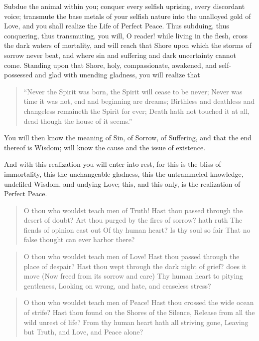 \documentclass[12pt,oneside]{scrbook}
\begin{document}
  Subdue the animal within you; conquer every selfish uprising, every
  discordant voice; transmute the base metals of your selfish nature into
  the unalloyed gold of Love, and you shall realize the Life of Perfect
  Peace. Thus subduing, thus conquering, thus transmuting, you will, O
  reader! while living in the flesh, cross the dark waters of mortality,
  and will reach that Shore upon which the storms of sorrow never beat,
  and where sin and suffering and dark uncertainty cannot come. Standing
  upon that Shore, holy, compassionate, awakened, and self-possessed and
  glad with unending gladness, you will realize that
  
  \begin{quote}
  ``Never the Spirit was born, the Spirit will cease to be never; Never
  was time it was not, end and beginning are dreams; Birthless and
  deathless and changeless remaineth the Spirit for ever; Death hath not
  touched it at all, dead though the house of it seems.''
  \end{quote}
  
  You will then know the meaning of Sin, of Sorrow, of Suffering, and that
  the end thereof is Wisdom; will know the cause and the issue of
  existence.
  
  And with this realization you will enter into rest, for this is the
  bliss of immortality, this the unchangeable gladness, this the
  untrammeled knowledge, undefiled Wisdom, and undying Love; this, and
  this only, is the realization of Perfect Peace.
  
  \begin{quote}
  O thou who wouldst teach men of Truth! Hast thou passed through the
  desert of doubt? Art thou purged by the fires of sorrow? hath ruth The
  fiends of opinion cast out Of thy human heart? Is thy soul so fair That
  no false thought can ever harbor there?
  \end{quote}
  
  \begin{quote}
  O thou who wouldst teach men of Love! Hast thou passed through the place
  of despair? Hast thou wept through the dark night of grief? does it move
  (Now freed from its sorrow and care) Thy human heart to pitying
  gentleness, Looking on wrong, and hate, and ceaseless stress?
  \end{quote}
  
  \begin{quote}
  O thou who wouldst teach men of Peace! Hast thou crossed the wide ocean
  of strife? Hast thou found on the Shores of the Silence, Release from
  all the wild unrest of life? From thy human heart hath all striving
  gone, Leaving but Truth, and Love, and Peace alone?
  \end{quote}
  
\end{document}
